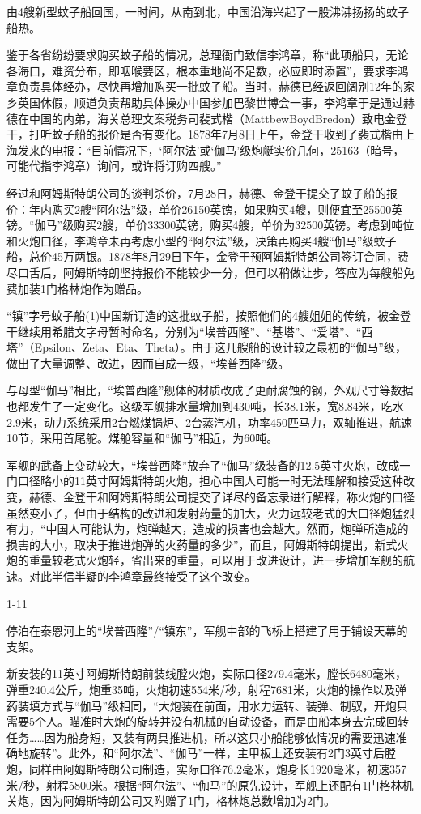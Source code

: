 \documentclass[12pt,UTF8]{ctexbook}
\begin{document}
由4艘新型蚊子船回国，一时间，从南到北，中国沿海兴起了一股沸沸扬扬的蚊子船热。

鉴于各省纷纷要求购买蚊子船的情况，总理衙门致信李鸿章，称“此项船只，无论各海口，难资分布，即咽喉要区，根本重地尚不足数，必应即时添置”，要求李鸿章负责具体经办，尽快再增加购买一批蚊子船。当时，赫德已经返回阔别12年的家乡英国休假，顺道负责帮助具体操办中国参加巴黎世博会一事，李鸿章于是通过赫德在中国的内弟，海关总理文案税务司裴式楷（MattbewBoydBredon）致电金登干，打听蚊子船的报价是否有变化。1878年7月8日上午，金登干收到了裴式楷由上海发来的电报：“目前情况下，‘阿尔法’或‘伽马’级炮艇实价几何，25163（暗号，可能代指李鸿章）询问，或许将订购四艘。”

经过和阿姆斯特朗公司的谈判杀价，7月28日，赫德、金登干提交了蚊子船的报价：年内购买2艘“阿尔法”级，单价26150英镑，如果购买4艘，则便宜至25500英镑。“伽马”级购买2艘，单价33300英镑，购买4艘，单价为32500英镑。考虑到吨位和火炮口径，李鸿章未再考虑小型的“阿尔法”级，决策再购买4艘“伽马”级蚊子船，总价45万两银。1878年8月29日下午，金登干预阿姆斯特朗公司签订合同，费尽口舌后，阿姆斯特朗坚持报价不能较少一分，但可以稍做让步，答应为每艘船免费加装1门格林炮作为赠品。

“镇”字号蚊子船(1)中国新订造的这批蚊子船，按照他们的4艘姐姐的传统，被金登干继续用希腊文字母暂时命名，分别为“埃普西隆”、“基塔”、“爱塔”、“西塔”（Epsilon、Zeta、Eta、Theta）。由于这几艘船的设计较之最初的“伽马”级，做出了大量调整、改进，因而自成一级，“埃普西隆”级。

与母型“伽马”相比，“埃普西隆”舰体的材质改成了更耐腐蚀的钢，外观尺寸等数据也都发生了一定变化。这级军舰排水量增加到430吨，长38.1米，宽8.84米，吃水2.9米，动力系统采用2台燃煤锅炉、2台蒸汽机，功率450匹马力，双轴推进，航速10节，采用首尾舵。煤舱容量和“伽马”相近，为60吨。

军舰的武备上变动较大，“埃普西隆”放弃了“伽马”级装备的12.5英寸火炮，改成一门口径略小的11英寸阿姆斯特朗火炮，担心中国人可能一时无法理解和接受这种改变，赫德、金登干和阿姆斯特朗公司提交了详尽的备忘录进行解释，称火炮的口径虽然变小了，但由于结构的改进和发射药量的加大，火力远较老式的大口径炮猛烈有力，“中国人可能认为，炮弹越大，造成的损害也会越大。然而，炮弹所造成的损害的大小，取决于推进炮弹的火药量的多少”，而且，阿姆斯特朗提出，新式火炮的重量较老式火炮轻，省出来的重量，可以用于改进设计，进一步增加军舰的航速。对此半信半疑的李鸿章最终接受了这个改变。

1-11

停泊在泰恩河上的“埃普西隆”/“镇东”，军舰中部的飞桥上搭建了用于铺设天幕的支架。

新安装的11英寸阿姆斯特朗前装线膛火炮，实际口径279.4毫米，膛长6480毫米，弹重240.4公斤，炮重35吨，火炮初速554米/秒，射程7681米，火炮的操作以及弹药装填方式与“伽马”级相同，“大炮装在前面，用水力运转、装弹、制驭，开炮只需要5个人。瞄准时大炮的旋转并没有机械的自动设备，而是由船本身去完成回转任务……因为船身短，又装有两具推进机，所以这只小船能够依情况的需要迅速准确地旋转”。此外，和“阿尔法”、“伽马”一样，主甲板上还安装有2门3英寸后膛炮，同样由阿姆斯特朗公司制造，实际口径76.2毫米，炮身长1920毫米，初速357米/秒，射程5800米。根据“阿尔法”、“伽马”的原先设计，军舰上还配有1门格林机关炮，因为阿姆斯特朗公司又附赠了1门，格林炮总数增加为2门。
\end{document}
